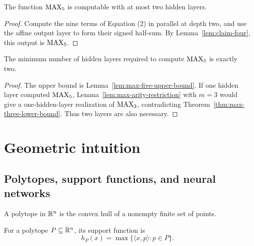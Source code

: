 \begin{lemma}
  \label{lem:max-five-upper-bound}
  The function $\operatorname{MAX}_5$ is computable with at most two hidden layers.
\end{lemma}
\begin{proof}
  Compute the nine terms of Equation (2) in parallel at depth two, and use the
  affine output layer to form their signed half-sum.  By
  Lemma~\ref{lem:claim-four}, this output is $\operatorname{MAX}_5$.
\end{proof}

\begin{proposition}
  \label{prop:max-five-depth}
  The minimum number of hidden layers required to compute $\operatorname{MAX}_5$ is exactly
  two.
\end{proposition}
\begin{proof}
  The upper bound is Lemma~\ref{lem:max-five-upper-bound}.  If one hidden layer
  computed $\operatorname{MAX}_5$, Lemma~\ref{lem:max-arity-restriction} with $m=3$ would
  give a one-hidden-layer realization of $\operatorname{MAX}_3$, contradicting
  Theorem~\ref{thm:max-three-lower-bound}.  Thus two layers are also necessary.
\end{proof}

\chapter{Geometric intuition}

\section{Polytopes, support functions, and neural networks}

\begin{definition}[Polytope]
  \label{def:polytope}
  A polytope in $\mathbb{R}^n$ is the convex hull of a nonempty finite set of points.
\end{definition}

\begin{definition}
  \label{def:support-function}
  For a polytope $P\subseteq\mathbb{R}^n$, its support function is
  \[
    h_P(x)=\max\{\langle x,p\rangle:p\in P\}.
  \]
\end{definition}


